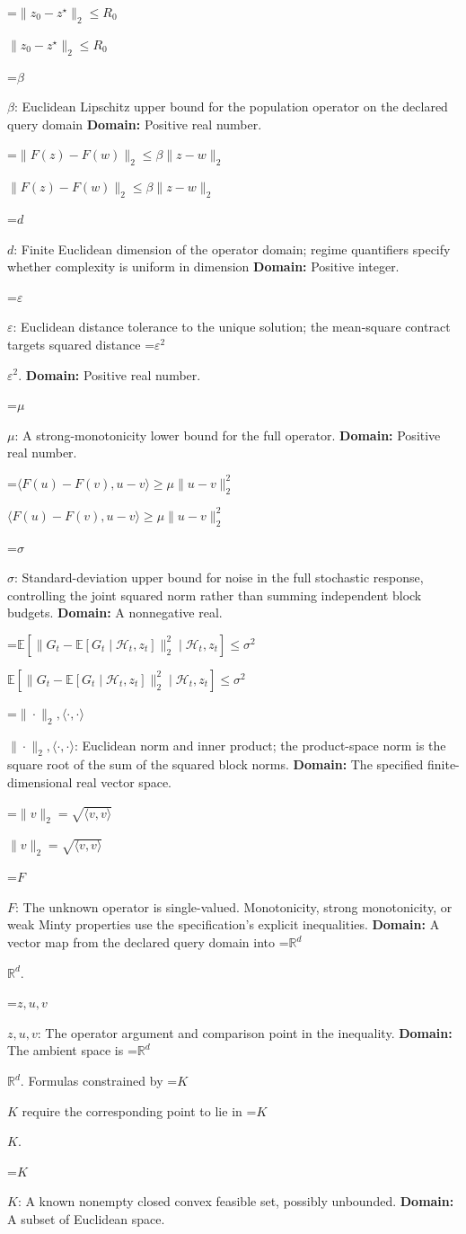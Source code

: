 \documentclass[10pt,a4paper]{article}
\newcommand{\AtlasMath}[1]{\par\begingroup\centering\setbox0=\hbox{$\displaystyle #1$}\ifdim\wd0>1.4\linewidth\typeout{ATLAS WIDE FORMULA: \the\wd0}\fi\ifdim\wd0>\linewidth\resizebox{\linewidth}{!}{\box0}\else\box0\fi\par\endgroup}
\newcommand{\AtlasInlineMath}[1]{\begingroup\setbox0=\hbox{$#1$}\ifdim\wd0>.4\linewidth\endgroup\AtlasMath{#1}\else\endgroup$#1$\fi}
\begin{document}
\AtlasInlineMath{\|z_0-z^\star\|_2\le R_0}

\AtlasInlineMath{\beta}: Euclidean Lipschitz upper bound for the population operator on the declared query domain \textbf{Domain:} Positive real number.

\AtlasInlineMath{\|F(z)-F(w)\|_2\le\beta\|z-w\|_2}

\AtlasInlineMath{d}: Finite Euclidean dimension of the operator domain; regime quantifiers specify whether complexity is uniform in dimension \textbf{Domain:} Positive integer.

\AtlasInlineMath{\varepsilon}: Euclidean distance tolerance to the unique solution; the mean-square contract targets squared distance \AtlasInlineMath{\varepsilon^2}. \textbf{Domain:} Positive real number.

\AtlasInlineMath{\mu}: A strong-monotonicity lower bound for the full operator. \textbf{Domain:} Positive real number.

\AtlasInlineMath{\langle F(u)-F(v),u-v\rangle\ge\mu\|u-v\|_2^2}

\AtlasInlineMath{\sigma}: Standard-deviation upper bound for noise in the full stochastic response, controlling the joint squared norm rather than summing independent block budgets. \textbf{Domain:} A nonnegative real.

\AtlasInlineMath{\mathbb E[\|G_t-\mathbb E[G_t\mid\mathcal H_t,z_t]\|_2^2\mid\mathcal H_t,z_t]\le\sigma^2}

\AtlasInlineMath{\|\cdot\|_2,\langle\cdot,\cdot\rangle}: Euclidean norm and inner product; the product-space norm is the square root of the sum of the squared block norms. \textbf{Domain:} The specified finite-dimensional real vector space.

\AtlasInlineMath{\|v\|_2=\sqrt{\langle v,v\rangle}}

\AtlasInlineMath{F}: The unknown operator is single-valued. Monotonicity, strong monotonicity, or weak Minty properties use the specification’s explicit inequalities. \textbf{Domain:} A vector map from the declared query domain into \AtlasInlineMath{\mathbb R^d}.

\AtlasInlineMath{z,u,v}: The operator argument and comparison point in the inequality. \textbf{Domain:} The ambient space is \AtlasInlineMath{\mathbb R^d}. Formulas constrained by \AtlasInlineMath{K} require the corresponding point to lie in \AtlasInlineMath{K}.

\AtlasInlineMath{K}: A known nonempty closed convex feasible set, possibly unbounded. \textbf{Domain:} A subset of Euclidean space.
\end{document}
